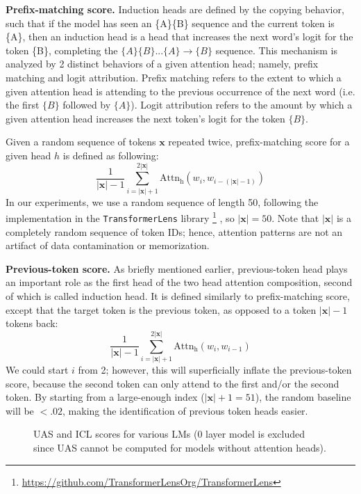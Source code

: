 
\noindent\textbf{Prefix-matching score.} Induction heads are defined by the copying behavior, such that if the model has seen an \{A\}\{B\} sequence and the current token is \{A\}, then an induction head is a head that increases the next word's logit for the token \{B\}, completing the $\{A\}\{B\} ... \{A\}\rightarrow\{B\}$ sequence. This mechanism is analyzed by 2 distinct behaviors of a given attention head; namely, prefix matching and logit attribution. Prefix matching refers to the extent to which a given attention head is attending to the previous occurrence of the next word (i.e. the first $\{B\}$ followed by $\{A\}$). Logit attribution refers to the amount by which a given attention head increases the next token's logit for the token $\{B\}$.

Given a random sequence of tokens $\mathbf{x}$ repeated twice, prefix-matching score for a given head $h$ is defined as following:
\begin{equation}
\frac{1}{|\mathbf{x}|-1}\sum_{i=|\mathbf{x}|+1}^{2|\mathbf{x}|}\mathrm{Attn_h}(w_i, w_{i-(|\mathbf{x}|-1)})
\end{equation}
In our experiments, we use a random sequence of length 50, following the implementation in the \texttt{TransformerLens} library \cite{nanda2022transformerlens}\footnote{\url{https://github.com/TransformerLensOrg/TransformerLens}} , so $|\mathbf{x}|=50$. Note that $|\mathbf{x}|$ is a completely random sequence of token IDs; hence, attention patterns are not an artifact of data contamination or memorization.

\noindent\textbf{Previous-token score.} As briefly mentioned earlier, previous-token head plays an important role as the first head of the two head attention composition, second of which is called induction head. It is defined similarly to prefix-matching score, except that the target token is the previous token, as opposed to a token $|\mathbf{x}|-1$ tokens back:
\begin{equation}
\frac{1}{|\mathbf{x}|-1}\sum_{i=|\mathbf{x}|+1}^{2|\mathbf{x}|}\mathrm{Attn_h}(w_i, w_{i-1})
\end{equation}
We could start $i$ from 2; however, this will superficially inflate the previous-token score, because the second token can only attend to the first and/or the second token. By starting from a large-enough index ($|\mathbf{x}|+1=51$), the random baseline will be $<.02$, making the identification of previous token heads easier.

\begin{figure}[t]
    \hspace{-15pt}
    
    \vspace{-20pt}
    \caption{UAS and ICL scores for various LMs (0 layer model is excluded since UAS cannot be computed for models without attention heads).}
    \label{fig:bump}
\end{figure}


